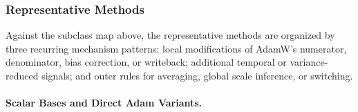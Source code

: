 \subsubsection{Representative Methods}
\label{sec:t1-methods}

Against the subclass map above, the representative methods are organized by
three recurring mechanism patterns: local modifications of AdamW's numerator,
denominator, bias correction, or writeback; additional temporal or
variance-reduced signals; and outer rules for averaging, global scale
inference, or switching.

\paragraph{Scalar Bases and Direct Adam Variants.}
\label{sec:t1-standard-variants}

